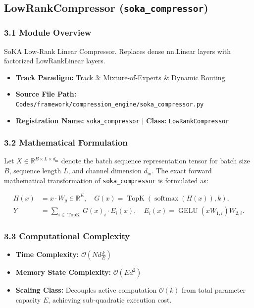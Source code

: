 \subsection{LowRankCompressor (\texttt{soka\_compressor})}
\label{sec:app_module_soka_compressor}

\subsubsection*{3.1 Module Overview}
SoKA Low-Rank Linear Compressor. Replaces dense nn.Linear layers with factorized LowRankLinear layers.
\begin{itemize}
    \item \textbf{Track Paradigm:} Track 3: Mixture-of-Experts & Dynamic Routing
    \item \textbf{Source File Path:} \texttt{Codes/framework/compression\_engine/soka\_compressor.py}
    \item \textbf{Registration Name:} \texttt{soka\_compressor} $\mid$ \textbf{Class:} \texttt{LowRankCompressor}
\end{itemize}

\subsubsection*{3.2 Mathematical Formulation}
Let $X \in \mathbb{R}^{B \times L \times d_{\text{in}}}$ denote the batch sequence representation tensor for batch size $B$, sequence length $L$, and channel dimension $d_{\text{in}}$. The exact forward mathematical transformation of \texttt{soka\_compressor} is formulated as:

\begin{align}
H(x) &= x \cdot W_g \in \mathbb{R}^{E}, \quad G(x) = \operatorname{TopK}\left(\operatorname{softmax}(H(x)), k\right), \\
Y &= \sum_{i \in \operatorname{TopK}} G(x)_i \cdot E_i(x), \quad E_i(x) = \operatorname{GELU}(x W_{1, i}) W_{2, i}.
\end{align}


\subsubsection*{3.3 Computational Complexity}
\begin{itemize}
    \item \textbf{Time Complexity:} $\mathcal{O}(N d \frac{k}{E})$
    \item \textbf{Memory State Complexity:} $\mathcal{O}(E d^2)$
    \item \textbf{Scaling Class:} Decouples active computation $\mathcal{O}(k)$ from total parameter capacity $E$, achieving sub-quadratic execution cost.
\end{itemize}

